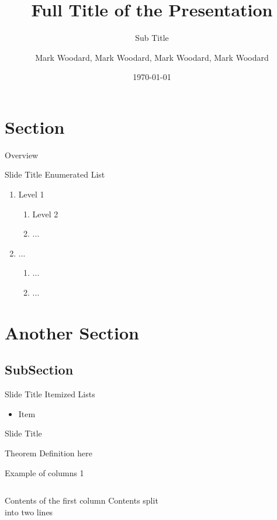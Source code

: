 \documentclass{beamer}
\title[Short Title]{Full Title of the Presentation}
\subtitle{Sub Title}
\author[Mark Woodard]{Mark Woodard, Mark Woodard, Mark Woodard, Mark Woodard}
\date{\today}
\institute{Missouri University of Science and Technology}
\begin{document}
\maketitle

\section{Section}
\begin{frame}{Overview}
  \tableofcontents
\end{frame}

\begin{frame}{Slide Title}
  Enumerated List~\cite{ipsum}\pause
  \begin{enumerate}
  \item Level 1
    \begin{enumerate}
    \item Level 2
    \item ...
    \end{enumerate}\pause
  \item ...
    \begin{enumerate}
    \item ...
    \item ...
    \end{enumerate}
  \end{enumerate}
\end{frame}

\section{Another Section}
\subsection{SubSection}
\begin{frame}{Slide Title}
  Itemized Lists~\cite{lorem}
  \begin{itemize}
  \item Item
  \end{itemize}
\end{frame}

\begin{frame}{Slide Title}
\begin{exampleblock}
{Theorem}
Definition here
\end{exampleblock}
\end{frame}

\begin{frame}{Example of columns 1}
 \begin{columns}[c]
  Contents of the first column
  Contents split \\ into two lines
 \end{columns}
\end{frame}
 
\end{document}
